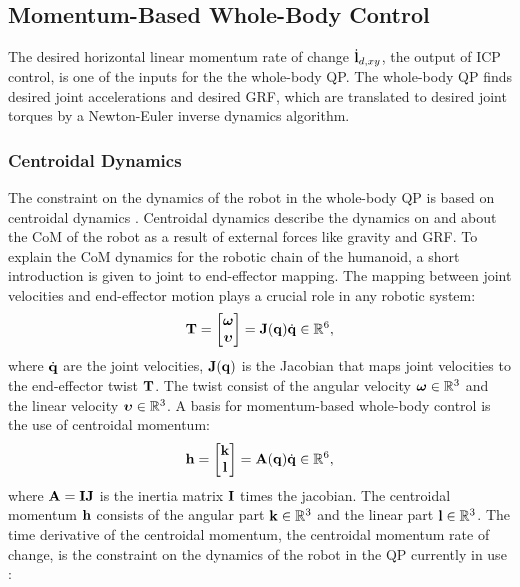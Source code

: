 \subsection{Momentum-Based Whole-Body Control}
The desired horizontal linear momentum rate of change $\dot{\mathbf{l}}_{d,xy}$, the output of \ac{ICP} control, is one of the inputs for the the whole-body \ac{QP}. The whole-body \ac{QP} finds desired joint accelerations and desired \ac{GRF}, which are translated to desired joint torques by a Newton-Euler inverse dynamics algorithm.

\subsubsection{Centroidal Dynamics}
The constraint on the dynamics of the robot in the whole-body \ac{QP} is based on centroidal dynamics \cite{orin2013centroidal}. Centroidal dynamics describe the dynamics on and about the \ac{CoM} of the robot as a result of external forces like gravity and \ac{GRF}. To explain the \ac{CoM} dynamics for the robotic chain of the humanoid, a short introduction is given to joint to end-effector mapping. The mapping between joint velocities and end-effector motion plays a crucial role in any robotic system:
\begin{equation}\label{eq:jacobian}
\mathbf{T}=\begin{bmatrix}\boldsymbol{\omega} \\ \boldsymbol{\upsilon} \end{bmatrix} = \mathbf{J}(\mathbf{q})\dot{\mathbf{q}} \in \mathbb{R}^6,
\end{equation}
where $\dot{\mathbf{q}}$ are the joint velocities, $\mathbf{J}(\mathbf{q})$ is the Jacobian that maps joint velocities to the end-effector twist $\mathbf{T}$. The twist consist of the angular velocity $\boldsymbol{\omega} \in \mathbb{R}^3$ and the linear velocity $\boldsymbol{\upsilon} \in \mathbb{R}^3$. A basis for momentum-based whole-body control is the use of centroidal momentum:
\begin{equation}
\mathbf{h}=\begin{bmatrix}\mathbf{k} \\ \mathbf{l} \end{bmatrix} =\mathbf{A}(\mathbf{q})\dot{\mathbf{q}} \in \mathbb{R}^6,
\end{equation}
 where $\mathbf{A}=\mathbf{I}\mathbf{J}$ is the inertia matrix $\mathbf{I}$ times the jacobian. The centroidal momentum $\mathbf{h}$ consists of the angular part $\mathbf{k} \in \mathbb{R}^3$ and the linear part $\mathbf{l} \in \mathbb{R}^3$. The time derivative of the centroidal momentum, the centroidal momentum rate of change, is the constraint on the dynamics of the robot in the \ac{QP} currently in use \cite{koolen2016design}:
